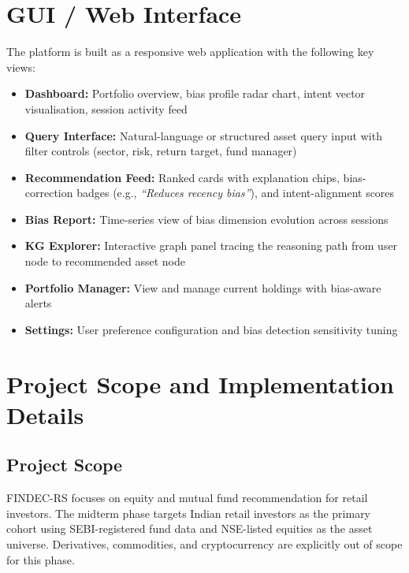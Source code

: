 \documentclass[12pt, a4paper]{article}
\begin{document}
\section{GUI / Web Interface}

The platform is built as a responsive web application with the following key views:

\begin{itemize}[leftmargin=1.5cm]
  \item \textbf{Dashboard:} Portfolio overview, bias profile radar chart, intent vector
        visualisation, session activity feed
  \item \textbf{Query Interface:} Natural-language or structured asset query input with
        filter controls (sector, risk, return target, fund manager)
  \item \textbf{Recommendation Feed:} Ranked cards with explanation chips, bias-correction
        badges (e.g., \textit{``Reduces recency bias''}), and intent-alignment scores
  \item \textbf{Bias Report:} Time-series view of bias dimension evolution across sessions
  \item \textbf{KG Explorer:} Interactive graph panel tracing the reasoning path from
        user node to recommended asset node
  \item \textbf{Portfolio Manager:} View and manage current holdings with bias-aware alerts
  \item \textbf{Settings:} User preference configuration and bias detection sensitivity tuning
\end{itemize}

\section{Project Scope and Implementation Details}

\subsection{Project Scope}

FINDEC-RS focuses on equity and mutual fund recommendation for retail investors.
The midterm phase targets Indian retail investors as the primary cohort using
SEBI-registered fund data and NSE-listed equities as the asset universe. Derivatives,
commodities, and cryptocurrency are explicitly out of scope for this phase.
\end{document}
